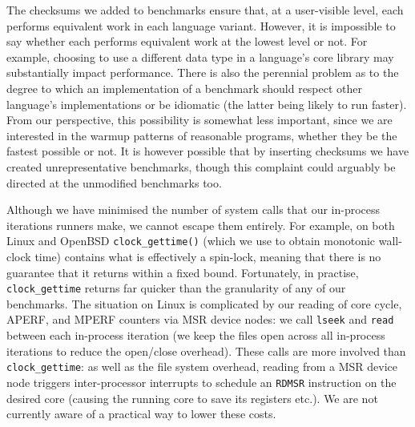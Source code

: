 \documentclass[preprint,numbers,10pt]{sigplanconf}
\begin{document}
The checksums we added to benchmarks ensure that, at a user-visible level, each
performs equivalent work in each language variant. However, it is impossible to
say whether each performs equivalent work at the lowest level or not. For
example, choosing to use a different data type in a language's core library may
substantially impact performance. There is also the perennial problem as to the
degree to which an implementation of a benchmark should respect other
language's implementations or be idiomatic (the latter being likely to
run faster). From our perspective, this possibility is somewhat less important,
since we are interested in the warmup patterns of reasonable programs,
whether they be the fastest possible or not. It is however possible that by
inserting checksums we have created unrepresentative benchmarks, though
this complaint could arguably be directed at the unmodified benchmarks too.

Although we have minimised the number of system calls that our in-process
iterations runners make, we cannot escape them entirely. For example,
on both Linux and OpenBSD \texttt{clock\_gettime()} (which we use to obtain
monotonic wall-clock time) contains what is effectively a spin-lock,
meaning that there is no guarantee that it returns within a fixed bound.
Fortunately, in practise, \texttt{clock\_gettime} returns far quicker than the granularity
of any of our benchmarks. \label{aperf/mperf error} The situation
on Linux is complicated by our reading of core cycle, APERF, and MPERF
counters via MSR device nodes: we call \texttt{lseek} and \texttt{read}
between each in-process iteration (we keep the files open across all
in-process iterations to reduce the open/close overhead).
These calls are more involved than \texttt{clock\_gettime}:
as well as the file system overhead, reading from a MSR device
node triggers inter-processor interrupts to schedule an \texttt{RDMSR}
instruction on the desired core (causing the running core to save its registers etc.).
We are not currently aware of a practical way to lower these costs.
\end{document}
